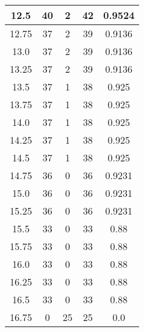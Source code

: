 \documentclass[letterpaper, 12pt]{article}
\begin{document}
\begin{longtable}{|c|c|c|c|c|}
12.5 & 40 & 2 & 42 & 0.9524 \\
\hline
12.75 & 37 & 2 & 39 & 0.9136 \\
\hline
13.0 & 37 & 2 & 39 & 0.9136 \\
\hline
13.25 & 37 & 2 & 39 & 0.9136 \\
\hline
13.5 & 37 & 1 & 38 & 0.925 \\
\hline
13.75 & 37 & 1 & 38 & 0.925 \\
\hline
14.0 & 37 & 1 & 38 & 0.925 \\
\hline
14.25 & 37 & 1 & 38 & 0.925 \\
\hline
14.5 & 37 & 1 & 38 & 0.925 \\
\hline
14.75 & 36 & 0 & 36 & 0.9231 \\
\hline
15.0 & 36 & 0 & 36 & 0.9231 \\
\hline
15.25 & 36 & 0 & 36 & 0.9231 \\
\hline
15.5 & 33 & 0 & 33 & 0.88 \\
\hline
15.75 & 33 & 0 & 33 & 0.88 \\
\hline
16.0 & 33 & 0 & 33 & 0.88 \\
\hline
16.25 & 33 & 0 & 33 & 0.88 \\
\hline
16.5 & 33 & 0 & 33 & 0.88 \\
\hline
16.75 & 0 & 25 & 25 & 0.0 \\
\hline
\end{longtable}
\end{document}
